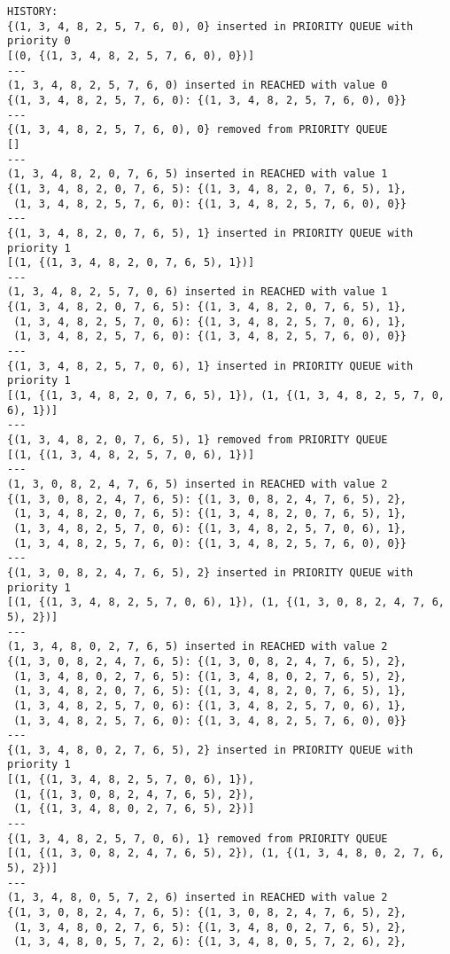 \documentclass{article}
\begin{document}
\begin{verbatim}
HISTORY:
{(1, 3, 4, 8, 2, 5, 7, 6, 0), 0} inserted in PRIORITY QUEUE with priority 0
[(0, {(1, 3, 4, 8, 2, 5, 7, 6, 0), 0})]
---
(1, 3, 4, 8, 2, 5, 7, 6, 0) inserted in REACHED with value 0
{(1, 3, 4, 8, 2, 5, 7, 6, 0): {(1, 3, 4, 8, 2, 5, 7, 6, 0), 0}}
---
{(1, 3, 4, 8, 2, 5, 7, 6, 0), 0} removed from PRIORITY QUEUE
[]
---
(1, 3, 4, 8, 2, 0, 7, 6, 5) inserted in REACHED with value 1
{(1, 3, 4, 8, 2, 0, 7, 6, 5): {(1, 3, 4, 8, 2, 0, 7, 6, 5), 1},
 (1, 3, 4, 8, 2, 5, 7, 6, 0): {(1, 3, 4, 8, 2, 5, 7, 6, 0), 0}}
---
{(1, 3, 4, 8, 2, 0, 7, 6, 5), 1} inserted in PRIORITY QUEUE with priority 1
[(1, {(1, 3, 4, 8, 2, 0, 7, 6, 5), 1})]
---
(1, 3, 4, 8, 2, 5, 7, 0, 6) inserted in REACHED with value 1
{(1, 3, 4, 8, 2, 0, 7, 6, 5): {(1, 3, 4, 8, 2, 0, 7, 6, 5), 1},
 (1, 3, 4, 8, 2, 5, 7, 0, 6): {(1, 3, 4, 8, 2, 5, 7, 0, 6), 1},
 (1, 3, 4, 8, 2, 5, 7, 6, 0): {(1, 3, 4, 8, 2, 5, 7, 6, 0), 0}}
---
{(1, 3, 4, 8, 2, 5, 7, 0, 6), 1} inserted in PRIORITY QUEUE with priority 1
[(1, {(1, 3, 4, 8, 2, 0, 7, 6, 5), 1}), (1, {(1, 3, 4, 8, 2, 5, 7, 0, 6), 1})]
---
{(1, 3, 4, 8, 2, 0, 7, 6, 5), 1} removed from PRIORITY QUEUE
[(1, {(1, 3, 4, 8, 2, 5, 7, 0, 6), 1})]
---
(1, 3, 0, 8, 2, 4, 7, 6, 5) inserted in REACHED with value 2
{(1, 3, 0, 8, 2, 4, 7, 6, 5): {(1, 3, 0, 8, 2, 4, 7, 6, 5), 2},
 (1, 3, 4, 8, 2, 0, 7, 6, 5): {(1, 3, 4, 8, 2, 0, 7, 6, 5), 1},
 (1, 3, 4, 8, 2, 5, 7, 0, 6): {(1, 3, 4, 8, 2, 5, 7, 0, 6), 1},
 (1, 3, 4, 8, 2, 5, 7, 6, 0): {(1, 3, 4, 8, 2, 5, 7, 6, 0), 0}}
---
{(1, 3, 0, 8, 2, 4, 7, 6, 5), 2} inserted in PRIORITY QUEUE with priority 1
[(1, {(1, 3, 4, 8, 2, 5, 7, 0, 6), 1}), (1, {(1, 3, 0, 8, 2, 4, 7, 6, 5), 2})]
---
(1, 3, 4, 8, 0, 2, 7, 6, 5) inserted in REACHED with value 2
{(1, 3, 0, 8, 2, 4, 7, 6, 5): {(1, 3, 0, 8, 2, 4, 7, 6, 5), 2},
 (1, 3, 4, 8, 0, 2, 7, 6, 5): {(1, 3, 4, 8, 0, 2, 7, 6, 5), 2},
 (1, 3, 4, 8, 2, 0, 7, 6, 5): {(1, 3, 4, 8, 2, 0, 7, 6, 5), 1},
 (1, 3, 4, 8, 2, 5, 7, 0, 6): {(1, 3, 4, 8, 2, 5, 7, 0, 6), 1},
 (1, 3, 4, 8, 2, 5, 7, 6, 0): {(1, 3, 4, 8, 2, 5, 7, 6, 0), 0}}
---
{(1, 3, 4, 8, 0, 2, 7, 6, 5), 2} inserted in PRIORITY QUEUE with priority 1
[(1, {(1, 3, 4, 8, 2, 5, 7, 0, 6), 1}),
 (1, {(1, 3, 0, 8, 2, 4, 7, 6, 5), 2}),
 (1, {(1, 3, 4, 8, 0, 2, 7, 6, 5), 2})]
---
{(1, 3, 4, 8, 2, 5, 7, 0, 6), 1} removed from PRIORITY QUEUE
[(1, {(1, 3, 0, 8, 2, 4, 7, 6, 5), 2}), (1, {(1, 3, 4, 8, 0, 2, 7, 6, 5), 2})]
---
(1, 3, 4, 8, 0, 5, 7, 2, 6) inserted in REACHED with value 2
{(1, 3, 0, 8, 2, 4, 7, 6, 5): {(1, 3, 0, 8, 2, 4, 7, 6, 5), 2},
 (1, 3, 4, 8, 0, 2, 7, 6, 5): {(1, 3, 4, 8, 0, 2, 7, 6, 5), 2},
 (1, 3, 4, 8, 0, 5, 7, 2, 6): {(1, 3, 4, 8, 0, 5, 7, 2, 6), 2},

\end{verbatim}
\end{document}
